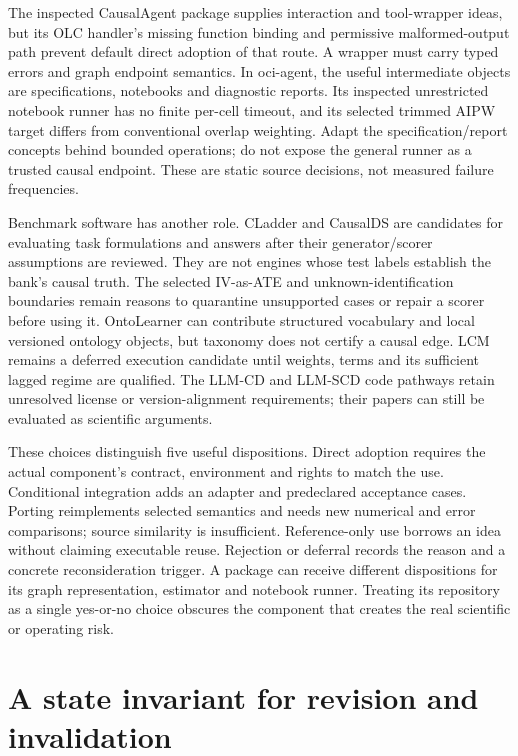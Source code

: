 The inspected CausalAgent package supplies interaction and tool-wrapper
ideas, but its OLC handler's missing function binding and permissive
malformed-output path prevent default direct adoption of that route. A
wrapper must carry typed errors and graph endpoint semantics. In oci-agent,
the useful intermediate objects are specifications, notebooks and diagnostic
reports. Its inspected unrestricted notebook runner has no finite per-cell
timeout, and its selected trimmed AIPW target differs from conventional
overlap weighting. Adapt the specification/report concepts behind bounded
operations; do not expose the general runner as a trusted causal endpoint.
These are static source decisions, not measured failure frequencies.
\cite{v12_la_package_causalagent,v12_la_package_oci_agent}

Benchmark software has another role. CLadder and CausalDS are candidates
for evaluating task formulations and answers after their generator/scorer
assumptions are reviewed. They are not engines whose test labels establish
the bank's causal truth. The selected IV-as-ATE and unknown-identification
boundaries remain reasons to quarantine unsupported cases or repair a
scorer before using it. OntoLearner can contribute structured vocabulary
and local versioned ontology objects, but taxonomy does not certify a
causal edge. LCM remains a deferred execution candidate until weights,
terms and its sufficient lagged regime are qualified. The LLM-CD and
LLM-SCD code pathways retain unresolved license or version-alignment
requirements; their papers can still be evaluated as scientific arguments.
\cite{v12_la_package_cladder,v12_la_package_causalds,v12_la_package_ontolearner,
v12_la_package_lcm,v12_la_package_llm_cd,v12_la_package_llm_scd}

These choices distinguish five useful dispositions. Direct adoption requires
the actual component's contract, environment and rights to match the use.
Conditional integration adds an adapter and predeclared acceptance cases.
Porting reimplements selected semantics and needs new numerical and error
comparisons; source similarity is insufficient. Reference-only use borrows
an idea without claiming executable reuse. Rejection or deferral records
the reason and a concrete reconsideration trigger. A package can receive
different dispositions for its graph representation, estimator and notebook
runner. Treating its repository as a single yes-or-no choice obscures the
component that creates the real scientific or operating risk.

\section{A state invariant for revision and invalidation}

